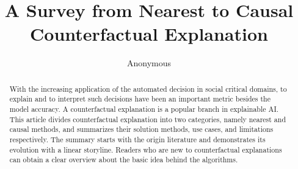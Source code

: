\documentclass[runningheads]{llncs}
\begin{document}
%
\title{A Survey from Nearest to Causal Counterfactual Explanation}
%
%
\author{Anonymous
}

%
\maketitle              %
%
\begin{abstract}
With the increasing application of the automated decision in social critical domains, to explain and to interpret such decisions have been an important metric besides the model accuracy. A counterfactual explanation is a popular branch in explainable AI. This article divides counterfactual explanation into two categories, namely nearest and causal methods, and summarizes their solution methods, use cases, and limitations respectively. The summary starts with the origin literature and demonstrates its evolution with a linear storyline. Readers who are new to counterfactual explanations can obtain a clear overview about the basic idea behind the algorithms.


\end{abstract}
%

%


%





%
%
% 
% 
%

%
{}
\end{document}
